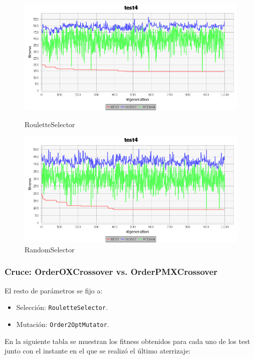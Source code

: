 \documentclass[a4paper,12pt,titlepage]{article}
\begin{document}
\begin{figure}[!ht]
\centering
\begin{minipage}{.5\textwidth}
  \centering
  \includegraphics[width=\textwidth]{RouletteSelector.png}
  \caption{RouletteSelector}
\end{minipage}%
\begin{minipage}{.5\textwidth}
  \centering
  \includegraphics[width=\textwidth]{RandomSelector.png}
  \caption{RandomSelector}
\end{minipage}
\end{figure}

\subsubsection{Cruce: OrderOXCrossover vs. OrderPMXCrossover}

El resto de parámetros se fijo a:

\begin{itemize}[noitemsep]
	\item Selección: \lstinline|RouletteSelector|.
	\item Mutación: \lstinline|Order2OptMutator|.	
\end{itemize}

En la siguiente tabla se muestran los fitness obtenidos para cada uno de los test junto con el instante en el que se realizó el último aterrizaje:
 
\end{document}
